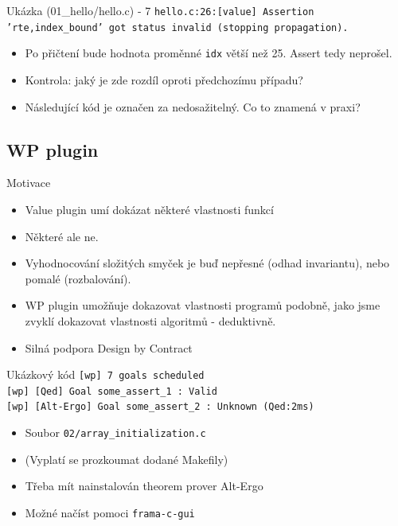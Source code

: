 \documentclass[11pt]{beamer}
\begin{document}
\begin{frame}{Ukázka (01\_hello/hello.c) - 7}
	\lstFirstValueMainPartFive
	\texttt{hello.c:26:[value] Assertion 'rte,index\_bound' got status invalid
	(stopping propagation).}
	\begin{itemize}
		\item Po přičtení bude hodnota proměnné \texttt{idx} větší než 25.
			Assert tedy neprošel.
		\pause \item Kontrola: jaký je zde rozdíl oproti předchozímu případu?
		\pause \item Následující kód je označen za nedosažitelný. Co to znamená v praxi?
	\end{itemize}
\end{frame}

\subsection{WP plugin}
\begin{frame}{Motivace}
	\begin{itemize}
		\item Value plugin umí dokázat některé vlastnosti funkcí
		\pause \item Některé ale ne.
		\item Vyhodnocování složitých smyček je buď nepřesné
			(odhad invariantu), nebo pomalé (rozbalování).
		\item WP plugin umožňuje dokazovat vlastnosti programů podobně, jako jsme zvyklí dokazovat vlastnosti algoritmů - deduktivně.
		\item Silná podpora Design by Contract
	\end{itemize}
\end{frame}



\begin{frame}{Ukázkový kód}
	\lstExIIwpBash
	\texttt{[wp] 7 goals scheduled}\\
	\texttt{[wp] [Qed] Goal some\_assert\_1 : Valid} \\
	\texttt{[wp] [Alt-Ergo] Goal some\_assert\_2 : Unknown (Qed:2ms)}
	\begin{itemize}
		\item Soubor \texttt{02/array\_initialization.c}
		\item (Vyplatí se prozkoumat dodané Makefily)
		\item Třeba mít nainstalován theorem prover Alt-Ergo
		\item Možné načíst pomoci \texttt{frama-c-gui}
	\end{itemize}
\end{frame}
\end{document}
